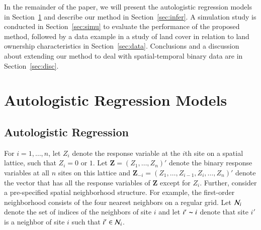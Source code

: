 \documentclass[authoryear,review, 12pt]{elsarticle}
\begin{document}
In the remainder of the paper, we will present the autologistic regression models in Section~\ref{sec:model} and describe our method in Section~\ref{sec:infer}.  A simulation study is conducted in Section~\ref{sec:simu} to evaluate the performance of the proposed method, followed by a data example in a study of land cover in relation to land ownership characteristics in Section~\ref{sec:data}.  Conclusions and a discussion about extending our method to deal with spatial-temporal binary data are in Section~\ref{sec:disc}.

%
%
\section{Autologistic Regression Models} 
\label{sec:model}

\subsection{Autologistic Regression}
\label{subsec:model:reg}

For $i=1,\ldots,n$, let $Z_i$ denote the response variable at the $i$th site on a spatial lattice, such that $Z_i=0$ or $1$.  Let $\bm{Z}=(Z_1, \ldots, Z_n)'$ denote the binary response variables at all $n$ sites on this lattice and $\bm{Z}_{-i}=(Z_1,\ldots,Z_{i-1},Z_{i},\ldots,Z_n)'$ denote the vector that has all the response variables of $\bm{Z}$ except for $Z_i$.  Further, consider  a pre-specified spatial neighborhood structure.  For example, the first-order neighborhood consists of the four nearest neighbors on a regular grid.  Let ${\cal N}_i$ denote the set of indices of the neighbors of site $i$ and let $i'\thicksim i$ denote that site $i'$ is a neighbor of site $i$ such that $i'\in{\cal N}_i$.
\end{document}
